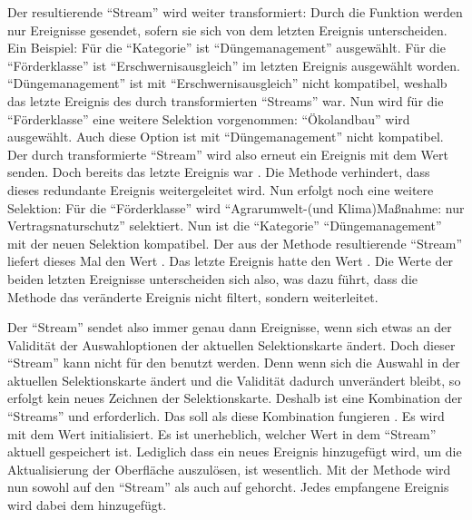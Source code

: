 Der resultierende \enquote{Stream} wird weiter transformiert: Durch die Funktion   werden nur Ereignisse gesendet,
sofern sie sich von dem letzten Ereignis unterscheiden.
Ein Beispiel: Für die \enquote{Kategorie} ist \enquote{Düngemanagement} ausgewählt.
Für die \enquote{Förderklasse} ist \enquote{Erschwernisausgleich} im letzten Ereignis ausgewählt worden.
\enquote{Düngemanagement} ist mit \enquote{Erschwernisausgleich} nicht kompatibel, weshalb das letzte Ereignis des durch  transformierten \enquote{Streams}  war.
Nun wird für die \enquote{Förderklasse} eine weitere Selektion vorgenommen: \enquote{Ökolandbau} wird ausgewählt.
Auch diese Option ist mit \enquote{Düngemanagement} nicht kompatibel.
Der durch  transformierte \enquote{Stream} wird also erneut ein Ereignis mit dem Wert  senden.
Doch bereits das letzte Ereignis war .
Die Methode  verhindert,
dass dieses redundante Ereignis weitergeleitet wird.
Nun erfolgt noch eine weitere Selektion: Für die \enquote{Förderklasse} wird \enquote{Agrarumwelt-(und Klima)Maßnahme: nur Vertragsnaturschutz} selektiert.
Nun ist die \enquote{Kategorie} \enquote{Düngemanagement} mit der neuen Selektion kompatibel.
Der aus der Methode  resultierende \enquote{Stream} liefert dieses Mal den Wert .
Das letzte Ereignis hatte den Wert .
Die Werte der beiden letzten Ereignisse unterscheiden sich also,
was dazu führt,
dass die Methode  das veränderte Ereignis nicht filtert, sondern weiterleitet.

Der \enquote{Stream}  sendet also immer genau dann Ereignisse,
wenn sich etwas an der Validität der Auswahloptionen der aktuellen Selektionskarte ändert.
Doch dieser \enquote{Stream} kann nicht für den  benutzt werden.
Denn wenn sich die Auswahl in der aktuellen Selektionskarte ändert
und die Validität dadurch unverändert bleibt,
so erfolgt kein neues Zeichnen der Selektionskarte.
Deshalb ist eine Kombination der \enquote{Streams}  und  erforderlich.
Das   soll als diese Kombination fungieren .
Es wird mit dem Wert  initialisiert.
Es ist unerheblich, welcher Wert in dem \enquote{Stream} aktuell gespeichert ist.
Lediglich dass ein neues Ereignis hinzugefügt wird,
um die Aktualisierung der Oberfläche auszulösen,
ist wesentlich.
Mit der Methode  wird nun sowohl auf den \enquote{Stream}   als auch auf   gehorcht. 
Jedes empfangene Ereignis wird dabei dem   hinzugefügt.

